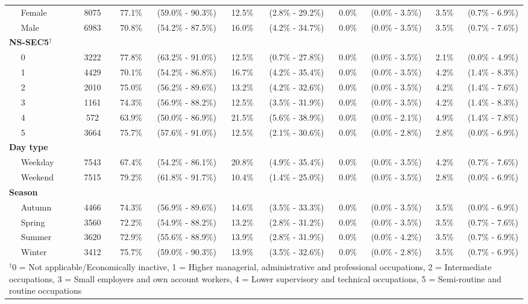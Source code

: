 \documentclass{article}
\begin{document}
\begin{landscape}
\begin{table}[ht]
\begin{tabular}{llccccccccc}
   & Female & 8075 & 77.1\% & (59.0\% - 90.3\%) & 12.5\% & (2.8\% - 29.2\%) & 0.0\% & (0.0\% - 3.5\%) & 3.5\% & (0.7\% - 6.9\%) \\ 
   & Male & 6983 & 70.8\% & (54.2\% - 87.5\%) & 16.0\% & (4.2\% - 34.7\%) & 0.0\% & (0.0\% - 3.5\%) & 3.5\% & (0.7\% - 7.6\%) \\[3pt] 
 \multicolumn{2}{l}{\textbf{NS-SEC5}$^\dagger$} \\
   & 0 & 3222 & 77.8\% & (63.2\% - 91.0\%) & 12.5\% & (0.7\% - 27.8\%) & 0.0\% & (0.0\% - 3.5\%) & 2.1\% & (0.0\% - 4.9\%) \\ 
   & 1 & 4429 & 70.1\% & (54.2\% - 86.8\%) & 16.7\% & (4.2\% - 35.4\%) & 0.0\% & (0.0\% - 3.5\%) & 4.2\% & (1.4\% - 8.3\%) \\ 
   & 2 & 2010 & 75.0\% & (56.2\% - 89.6\%) & 13.2\% & (4.2\% - 32.6\%) & 0.0\% & (0.0\% - 3.5\%) & 4.2\% & (1.4\% - 7.6\%) \\ 
   & 3 & 1161 & 74.3\% & (56.9\% - 88.2\%) & 12.5\% & (3.5\% - 31.9\%) & 0.0\% & (0.0\% - 3.5\%) & 4.2\% & (1.4\% - 8.3\%) \\ 
   & 4 & 572 & 63.9\% & (50.0\% - 86.9\%) & 21.5\% & (5.6\% - 38.9\%) & 0.0\% & (0.0\% - 2.1\%) & 4.9\% & (1.4\% - 7.8\%) \\ 
   & 5 & 3664 & 75.7\% & (57.6\% - 91.0\%) & 12.5\% & (2.1\% - 30.6\%) & 0.0\% & (0.0\% - 2.8\%) & 2.8\% & (0.0\% - 6.9\%) \\[3pt]
 \multicolumn{2}{l}{\textbf{Day type}} \\ 
   & Weekday & 7543 & 67.4\% & (54.2\% - 86.1\%) & 20.8\% & (4.9\% - 35.4\%) & 0.0\% & (0.0\% - 3.5\%) & 4.2\% & (0.7\% - 7.6\%) \\ 
   & Weekend & 7515 & 79.2\% & (61.8\% - 91.7\%) & 10.4\% & (1.4\% - 25.0\%) & 0.0\% & (0.0\% - 3.5\%) & 2.8\% & (0.0\% - 6.9\%) \\[3pt]
 \multicolumn{2}{l}{\textbf{Season}} \\
   & Autumn & 4466 & 74.3\% & (56.9\% - 89.6\%) & 14.6\% & (3.5\% - 33.3\%) & 0.0\% & (0.0\% - 3.5\%) & 3.5\% & (0.0\% - 6.9\%) \\ 
   & Spring & 3560 & 72.2\% & (54.9\% - 88.2\%) & 13.2\% & (2.8\% - 31.2\%) & 0.0\% & (0.0\% - 3.5\%) & 3.5\% & (0.7\% - 7.6\%) \\ 
   & Summer & 3620 & 72.9\% & (55.6\% - 88.9\%) & 13.9\% & (2.8\% - 31.9\%) & 0.0\% & (0.0\% - 4.2\%) & 3.5\% & (0.7\% - 6.9\%) \\ 
   & Winter & 3412 & 75.7\% & (59.0\% - 90.3\%) & 13.9\% & (3.5\% - 32.6\%) & 0.0\% & (0.0\% - 2.8\%) & 3.5\% & (0.7\% - 6.9\%) \\[3pt] 
   \hline
   \hline
   \multicolumn{11}{p{19cm}}{\textbf{$^\dagger$}\footnotesize 0 = Not applicable/Economically inactive, 1 = Higher managerial, administrative and professional occupations, 2 = Intermediate occupations, 3 = Small employers and own account workers, 4 = Lower supervisory and technical occupations, 5 = Semi-routine and routine occupations} \\
\end{tabular}
\end{table}
\end{landscape}
\end{document}
